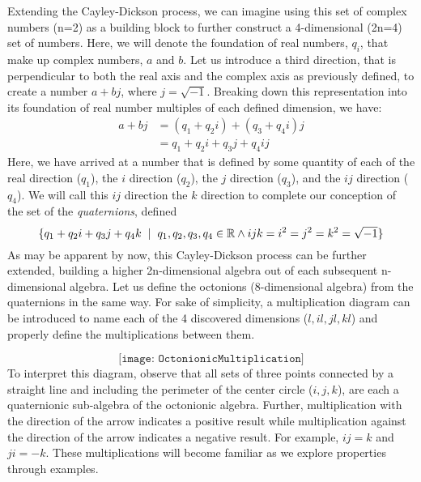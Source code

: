 \documentclass{article}
\theoremstyle{plain}
\begin{document}
Extending the Cayley-Dickson process, we can imagine using this set of complex numbers (n=2) as a building block to further construct a 4-dimensional (2n=4) set of numbers. Here, we will denote the foundation of real numbers, $q_i$, that make up complex numbers, $a$ and $b$. Let us introduce a third direction, that is perpendicular to both the real axis and the complex axis as previously defined, to create a number $a+bj$, where $j=\sqrt{-1}$. Breaking down this representation into its foundation of real number multiples of each defined dimension, we have:
\begin{align*} 
a+bj &= (q_1+q_2i)+(q_3+q_4i)j \\
&= q_1+q_2i+q_3j+q_4ij
\end{align*}
Here, we have arrived at a number that is defined by some quantity of each of the real direction ($q_1$), the $i$ direction ($q_2$), the $j$ direction ($q_3$), and the $ij$ direction ($q_4$). We will call this $ij$ direction the $k$ direction to complete our conception of the set of the \emph{quaternions}, defined 
$$\{q_1+q_2i+q_3j+q_4k\hspace{2 mm}|\hspace{2 mm} q_1,q_2,q_3,q_4 \in \mathbb{R} \land ijk=i^2=j^2=k^2=\sqrt{-1}\}$$
As may be apparent by now, this Cayley-Dickson process can be further extended, building a higher 2n-dimensional algebra out of each subsequent n-dimensional algebra. Let us define the octonions (8-dimensional algebra) from the quaternions in the same way. For sake of simplicity, a multiplication diagram can be introduced to name each of the 4 discovered dimensions ($l,il,jl,kl$) and properly define the multiplications between them.

$$\texttt{[image: OctonionicMultiplication]}$$
To interpret this diagram, observe that all sets of three points connected by a straight line and including the perimeter of the center circle ($i,j,k$), are each a quaternionic sub-algebra of the octonionic algebra. Further, multiplication with the direction of the arrow indicates a positive result while multiplication against the direction of the arrow indicates a negative result. For example, $ij=k$ and $ji = -k$. These multiplications will become familiar as we explore properties through examples.


\end{document}
